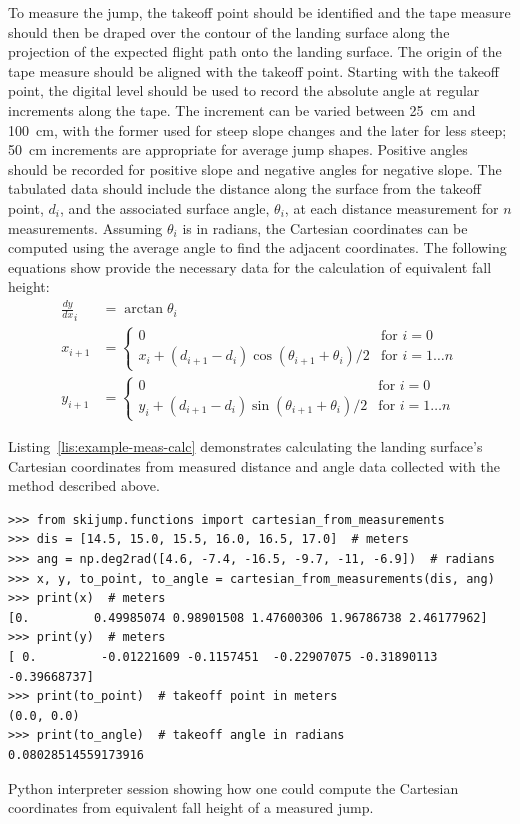 \documentclass[smallextended]{svjour3}       %
\begin{document}
To measure the jump, the takeoff point should be identified and the tape
measure should then be draped over the contour of the landing surface along the
projection of the expected flight path onto the landing surface. The origin of
the tape measure should be aligned with the takeoff point. Starting with the
takeoff point, the digital level should be used to record the absolute angle at
regular increments along the tape. The increment can be varied between
25~\si{\centi\meter} and 100~\si{\centi\meter}, with the former used for steep
slope changes and the later for less steep; 50~\si{\centi\meter} increments are
appropriate for average jump shapes. Positive angles should be recorded for
positive slope and negative angles for negative slope. The tabulated data
should include the distance along the surface from the takeoff point, $d_i$,
and the associated surface angle, $\theta_i$, at each distance measurement for
$n$ measurements. Assuming $\theta_i$ is in radians, the Cartesian coordinates
can be computed using the average angle to find the adjacent coordinates. The
following equations show provide the necessary data for the calculation of
equivalent fall height:
%
\begin{align}
  \frac{dy}{dx}_{i} & = \arctan{\theta_i} \\
  x_{i + 1} & =
  \begin{cases}
    0 & \text{for } i=0 \\
    x_i + (d_{i+1} - d_i)\cos{(\theta_{i+1} + \theta_i)/2} &  \text{for } i=1\ldots n
  \end{cases} \\
  y_{i + 1} & =
  \begin{cases}
    0 & \text{for } i=0 \\
    y_i + (d_{i+1} - d_i)\sin{(\theta_{i+1} + \theta_i)/2} &  \text{for } i=1\ldots n
  \end{cases}
\end{align}

Listing~\ref{lis:example-meas-calc} demonstrates calculating the landing
surface's Cartesian coordinates from measured distance and angle data collected
with the method described above.
%
\begin{listing*}
  \begin{verbatim}
>>> from skijump.functions import cartesian_from_measurements
>>> dis = [14.5, 15.0, 15.5, 16.0, 16.5, 17.0]  # meters
>>> ang = np.deg2rad([4.6, -7.4, -16.5, -9.7, -11, -6.9])  # radians
>>> x, y, to_point, to_angle = cartesian_from_measurements(dis, ang)
>>> print(x)  # meters
[0.         0.49985074 0.98901508 1.47600306 1.96786738 2.46177962]
>>> print(y)  # meters
[ 0.         -0.01221609 -0.1157451  -0.22907075 -0.31890113 -0.39668737]
>>> print(to_point)  # takeoff point in meters
(0.0, 0.0)
>>> print(to_angle)  # takeoff angle in radians
0.08028514559173916
  \end{verbatim}
  \caption{Python interpreter session showing how one could compute the
  Cartesian coordinates from equivalent fall height of a measured jump.}
  \label{lis:example-meas-calc}
\end{listing*}
\end{document}
